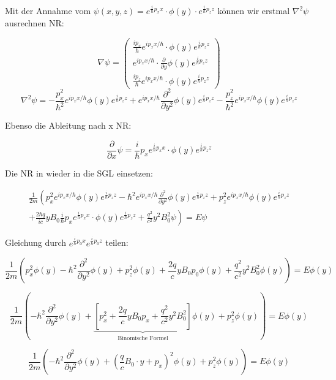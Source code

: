 Mit der Annahme vom \(\psi(x,y,z) = e^{\frac{i}{\hbar}p_xx}\cdot \phi(y)\cdot e^{\frac{i}{\hbar}p_zz}\) können wir erstmal \(\nabla^2\psi\) ausrechnen NR:

\[\nabla\psi = \begin{pmatrix} \frac{ip_x}{\hbar}e^{ip_xx/\hbar}\cdot\phi(y)e^{\frac{i}{\hbar}p_zz} \\ e^{ip_xx/\hbar}\cdot\frac{\partial}{\partial y}\phi(y)e^{\frac{i}{\hbar}p_zz}\\\frac{ip_z}{\hbar}e^{ip_xx/\hbar}\cdot\phi(y)e^{\frac{i}{\hbar}p_zz} \end{pmatrix}  \]
\[\nabla^2\psi =- \frac{p_x^2}{\hbar^2}e^{ip_xx/\hbar}\phi(y)e^{\frac{i}{\hbar}p_zz} + e^{ip_xx/\hbar}\frac{\partial^2}{\partial y^2}\phi(y)e^{\frac{i}{\hbar}p_zz}  - \frac{p_z^2}{\hbar^2}e^{ip_xx/\hbar}\phi(y)e^{\frac{i}{\hbar}p_zz}\]

Ebenso die Ableitung nach x NR:

\[\frac{\partial}{\partial x}\psi =\frac{i}{\hbar}p_x e^{\frac{i}{\hbar}p_xx}\cdot \phi(y) e^{\frac{i}{\hbar}p_zz} \]


Die NR in wieder in die SGL einsetzen:


\[\begin{split} \frac{1}{2m}\left(p_x^2e^{ip_xx/\hbar}\phi(y)e^{\frac{i}{\hbar}p_zz} -\hbar^2e^{ip_xx/\hbar}\frac{\partial^2}{\partial y^2}\phi(y)e^{\frac{i}{\hbar}p_zz} + p_z^2e^{ip_xx/\hbar}\phi(y)e^{\frac{i}{\hbar}p_zz}  \right. \\
\left.  + \frac{2 \hbar q}{ic} yB_0\frac{i}{\hbar}p_x e^{\frac{i}{\hbar}p_xx}\cdot \phi(y)e^{\frac{i}{\hbar}p_zz}  + \frac{q^2}{c^2}y^2B_0^2\psi \right) = E\psi \end{split} \]

Gleichung durch \( e^{\frac{i}{\hbar}p_0x} e^{\frac{i}{\hbar}p_0z} \) teilen:

\[ \frac{1}{2m}\left(p_x^2\phi(y) - \hbar^2 \frac{\partial^2}{\partial y^2}\phi(y) + p_z^2\phi(y) + \frac{2 q}{c} yB_0p_0  \phi(y)  + \frac{q^2}{c^2}y^2B_0^2\phi(y) \right) = E \phi(y) \]


\[  \frac{1}{2m}\left(- \hbar^2\frac{\partial^2}{\partial y^2}\phi(y) +  \underbrace{\left[p_x^2 + \frac{2 q}{c} yB_0p_x   + \frac{q^2}{c^2}y^2B_0^2\right]}_{\text{Binomische Formel}}\phi(y) + p_z^2\phi(y) \right) = E \phi(y) \]

\[  \frac{1}{2m}\left(-\hbar^2 \frac{\partial^2}{\partial y^2}\phi(y) +  (\frac{q}{c}B_0\cdot y +  p_x )^2\phi(y) + p_z^2\phi(y) \right) = E \phi(y) \]


